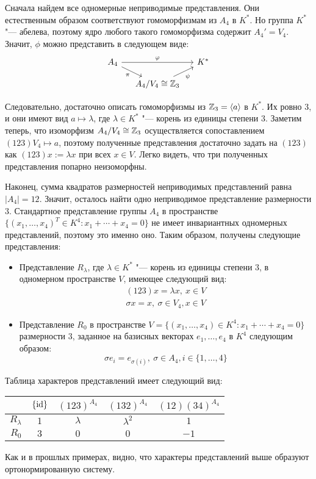 \begin{solution}
	Сначала найдем все одномерные неприводимые представления. Они естественным образом соответствуют гомоморфизмам из $A_4$ в $K^*$. Но группа $K^*$ "--- абелева, поэтому ядро любого такого гомоморфизма содержит $A_4' = V_4$. Значит, $\phi$ можно представить в следующем виде:
	\[
	\begin{tikzcd}[row sep = small, column sep = small]
		A_4 \arrow[swap]{dr}{\pi} \arrow[]{rr}{\phi} && K^*\\
		& A_4 / V_4 \cong \Z_3 \arrow[swap]{ur}{\psi}&
	\end{tikzcd}
	\]
	
	Следовательно, достаточно описать гомоморфизмы из $\mathbb{Z}_3 = \langle a \rangle$ в $K^*$. Их ровно $3$, и они имеют вид $a \mapsto \lambda$, где $\lambda \in K^*$ "--- корень из единицы степени $3$. Заметим теперь, что изоморфизм $A_4 / V_4 \cong \mathbb{Z}_3$ осуществляется сопоставлением $(123)V_4 \mapsto a$, поэтому полученные представления достаточно задать на $(123)$ как $(123)x := \lambda x$ при всех $x \in V$. Легко видеть, что три полученных представления попарно неизоморфны.
	
	Наконец, сумма квадратов размерностей неприводимых представлений равна $|A_4| = 12$. Значит, осталось найти одно неприводимое представление размерности $3$. Стандартное представление группы $A_4$ в пространстве $\{(x_1, \dotsc, x_4)^T \in K^4 : x_1 + \dotsb + x_4 = 0\}$ не имеет инвариантных одномерных представлений, поэтому это именно оно. Таким образом, получены следующие представления:
	\begin{itemize}
		\item Представление $R_\lambda$, где $\lambda \in K^*$ "--- корень из единицы степени $3$, в одномерном пространстве $V$, имеющее следующий вид:
		\begin{gather*}
			(123) x = \lambda x,~x \in V\\
			\sigma x = x,~\sigma \in V_4, x \in V
		\end{gather*}
		
		\item Представление $R_0$ в пространстве $V = \{(x_1, \dotsc, x_4) \in K^4 : x_1 + \dotsb + x_4 = 0\}$ размерности $3$, заданное на базисных векторах $e_1, \dotsc, e_4$ в $K^4$ следующим образом:
		\[\sigma e_i = e_{\sigma(i)},~\sigma \in A_4, i \in \{1, \dotsc, 4\}\]
	\end{itemize}
	
	Таблица характеров представлений имеет следующий вид:
	\begin{center}
		\begin{tabular}{r|c|c|c|c}
			& $\{\mathrm{id}\}$ & $(123)^{A_4}$ & $(132)^{A_4}$ & $(12)(34)^{A_4}$ \\ \hline
			$R_\lambda$ &    $1$    &   $\lambda$   &  $\lambda^2$  &      $1$      \\ \hline
			$R_0$ &    $3$    &      $0$      &      $0$      &       $-1$
		\end{tabular}
	\end{center}
	
	Как и в прошлых примерах, видно, что характеры представлений выше образуют ортонормированную систему.
\end{solution}


